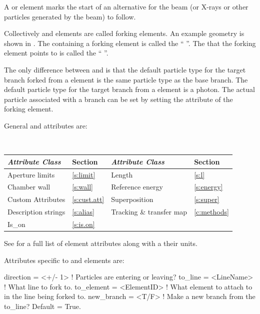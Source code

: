 A  or  element marks the start of an alternative  for the beam
(or X-rays or other particles generated by the beam) to follow.

Collectively  and  elements are called forking elements. An example
geometry is shown in .  The  containing a forking element is called the
`` ''. The  that the forking element points to is called the
`` ''.

The only difference between  and  is that the default particle type for the
target branch forked from a  element is the same particle type as the base branch. The
default particle type for the target branch from a  element is a photon. The actual
particle associated with a branch can be set by setting the  attribute of the forking
element.

General  and  attributes are:
\begin{center}
\tt
\begin{tabular}{llll} \toprule
  {\sl Attribute Class}      & Section           & {\sl Attribute Class}      & Section         \\ \midrule
  Aperture limits            & \ref{s:limit}     & Length                     & \ref{s:l}       \\
  Chamber wall               & \ref{s:wall}      & Reference energy           & \ref{s:energy}  \\ 
  Custom Attributes          & \ref{s:cust.att}  & Superposition              & \ref{s:super}   \\
  Description strings        & \ref{s:alias}     & Tracking \& transfer map   & \ref{c:methods} \\ 
  Is_on                      & \ref{s:is.on}     &                            &                 \\
  \bottomrule
\end{tabular}
\end{center}
\toffset
See  for a full list of element attributes along with a their units.

Attributes specific to  and  elements are:
\begin{example}
  direction    = <+/- 1>      ! Particles are entering or leaving?
  to_line      = <LineName>   ! What line to fork to.
  to_element   = <ElementID>  ! What element to attach to in the line being forked to.
  new_branch   = <T/F>        ! Make a new branch from the to_line? Default = True.
\end{example}

